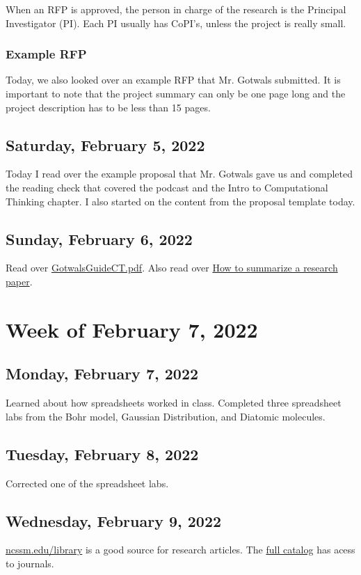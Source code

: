 \documentclass[11pt,letterpaper]{article}
\begin{document}
When an RFP is approved, the person in charge of the research is the Principal Investigator (PI). Each PI usually has CoPI's, unless the project is really small. 

\subsubsection * {Example RFP}
Today, we also looked over an example RFP that Mr. Gotwals submitted. It is important to note that the project summary can only be one page long and the project description has to be less than 15 pages. 

\subsection{Saturday, February 5, 2022}
Today I read over the example proposal that Mr. Gotwals gave us and completed the reading check that covered the podcast and the Intro to Computational Thinking chapter. I also started on the content from the proposal template today.

\subsection{Sunday, February 6, 2022}
Read over \href{https://drive.google.com/file/d/1weJUCV1x84bmy6dvqFjRlOviiD8dVDjg/view?usp=sharing}{GotwalsGuideCT.pdf}. Also read over \href{https://drive.google.com/file/d/1p4ew41jI2WH81WCaB8ADkFOrTVsac7Wl/view?usp=sharing}{How to summarize a research paper}.

\section{Week of February 7, 2022}
\subsection{Monday, February 7, 2022}
Learned about how spreadsheets worked in class. Completed three spreadsheet labs from the Bohr model, Gaussian Distribution, and Diatomic molecules. 

\subsection{Tuesday, February 8, 2022}
Corrected one of the spreadsheet labs.

\subsection{Wednesday, February 9, 2022}
\href{https://www.ncssm.edu/library}{ncssm.edu/library} is a good source for research articles. The \href{https://ncssm.follettdestiny.com/common/servlet/presenthomeform.do?l2m=Home&tm=Home&l2m=Home}{full catalog} has acess to journals.
\end{document}
